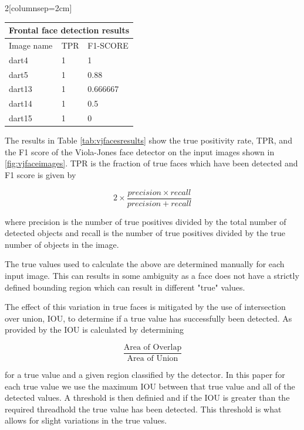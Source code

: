 \documentclass{article}
\begin{document}
\begin{multicols}{2}[columnsep=2cm]
\begin{center}
\begin{tabular}{ |p{2cm}||p{2cm}|p{2cm}| }
 \hline
 \multicolumn{3}{|c|}{Frontal face detection results} \\
 \hline
 Image name & TPR & F1-SCORE \\
 \hline
 dart4  & 1   & 1         \\
 dart5  & 1   & 0.88      \\
 dart13 & 1   & 0.666667  \\ 
 dart14 & 1   & 0.5       \\ 
 dart15 & 1   & 0         \\ 
 \hline
\end{tabular}
\label{tab:vjfacesresults}
\end{center}

\bigskip

The results in Table \ref{tab:vjfacesresults} show the true positivity rate, TPR, and the F1 score of the Viola-Jones face detector on the input images shown in \ref{fig:vjfaceimages}. TPR is the fraction of true faces which have been detected and F1 score is given by

\[ 2 \times \frac{precision \times recall}{precision + recall} \]

where precision is the number of true positives divided by the total number of detected objects and recall is the number of true positives divided by the true number of objects in the image.

The true values used to calculate the above are determined manually for each
input image. This can results in some ambiguity as a face does not have a
strictly defined bounding region which can result in different "true" values. 

The effect of this variation in true faces is mitigated by the use of intersection over union, IOU, to determine if a true value has successfully been detected. As provided by \cite{iou} the IOU is calculated by determining 

\[ \frac{\mbox{Area of Overlap}}{\mbox{Area of Union}}\] 

for a true value and a given region classified by the detector. In this paper
for each true value we use the maximum IOU between that true value and all of
the detected values. A threshold is then definied and if the IOU is greater
than the required threadhold the true value has been detected. This threshold
is what allows for slight variations in the true values.


\end{multicols}
\end{document}
